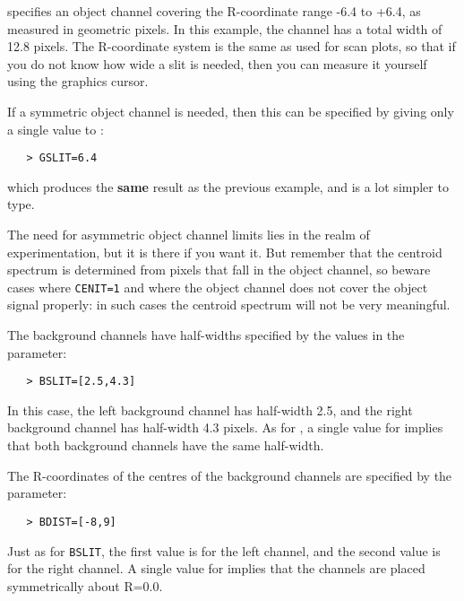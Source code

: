 \begin{htmlonly}
specifies an object channel covering the R-coordinate range -6.4 to +6.4,
as measured in geometric pixels.  In this example, the channel has a total
width of 12.8 pixels.  The R-coordinate system is the same as used for
scan plots, so that if you do not know how wide a slit is needed, then you can
measure it yourself using the graphics cursor.
\end{htmlonly}

If a symmetric object channel is needed, then this can be specified by
giving only a single value to :

\begin{verbatim}
   > GSLIT=6.4
\end{verbatim}

which produces the {\bf same} result as the previous example, and is a lot
simpler to type.

The need for asymmetric object channel limits lies in the realm of
experimentation, but it is there if you want it.  But remember that the
centroid spectrum is determined from pixels that fall in the object channel,
so beware cases where \verb+CENIT=1+ and where the object channel does not
cover the object signal properly: in such cases the centroid spectrum will not
be very meaningful.

The background channels have half-widths specified by the values in the
 parameter:

\begin{verbatim}
   > BSLIT=[2.5,4.3]
\end{verbatim}

In this case, the left background channel has half-width 2.5, and the
right background channel has half-width 4.3 pixels.  As for
, a single value for
 implies that both background channels have the
same half-width.

The R-coordinates of the centres of the background channels are specified by
the  parameter:

\begin{verbatim}
   > BDIST=[-8,9]
\end{verbatim}

Just as for \verb+BSLIT+, the first value is for the left channel, and the
second value is for the right channel.  A single value for
 implies that the channels are placed
symmetrically about R=0.0\@.

